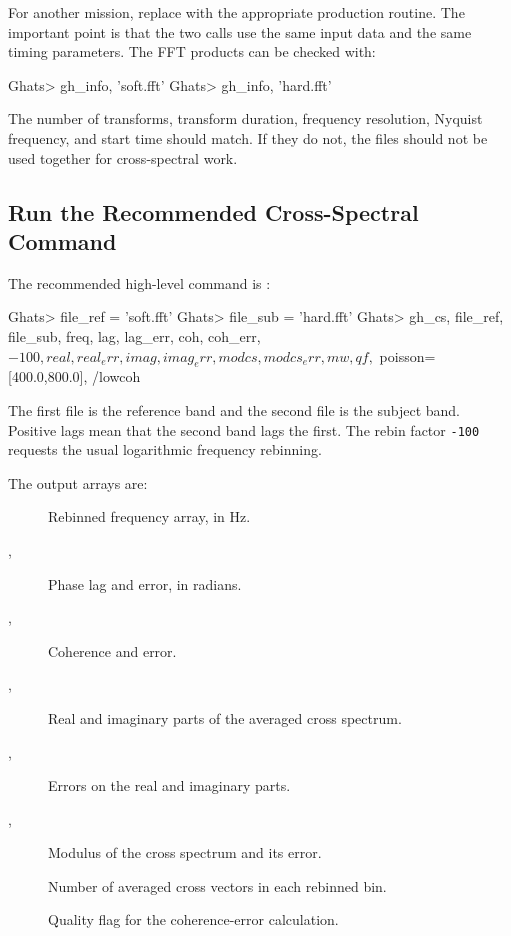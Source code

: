 For another mission, replace  with the appropriate
production routine.  The important point is that the two calls use the same
input data and the same timing parameters.  The FFT products can be checked
with:

\begin{ghatsconsole}
Ghats> gh_info, 'soft.fft'
Ghats> gh_info, 'hard.fft'
\end{ghatsconsole}

The number of transforms, transform duration, frequency resolution, Nyquist
frequency, and start time should match.  If they do not, the files should not
be used together for cross-spectral work.

\subsection*{Run the Recommended Cross-Spectral Command}

The recommended high-level command is :

\begin{ghatsconsole}
Ghats> file_ref = 'soft.fft'
Ghats> file_sub = 'hard.fft'
Ghats> gh_cs, file_ref, file_sub, freq, lag, lag_err, coh, coh_err, $
       -100, real, real_err, imag, imag_err, modcs, modcs_err, mw, qf, $
       poisson=[400.0,800.0], /lowcoh
\end{ghatsconsole}

The first file is the reference band and the second file is the subject band.
Positive lags mean that the second band lags the first.  The rebin factor
\texttt{-100} requests the usual logarithmic frequency rebinning.

The output arrays are:

\begin{description}
\item[] Rebinned frequency array, in Hz.
\item[, ] Phase lag and error, in radians.
\item[, ] Coherence and error.
\item[, ] Real and imaginary parts of the averaged
  cross spectrum.
\item[, ] Errors on the real and imaginary
  parts.
\item[, ] Modulus of the cross spectrum and its
  error.
\item[] Number of averaged cross vectors in each rebinned bin.
\item[] Quality flag for the  coherence-error
  calculation.
\end{description}

